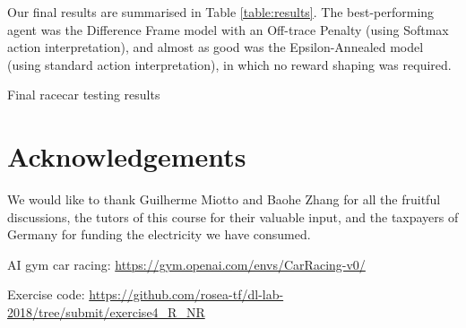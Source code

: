 \documentclass[a4paper, 11pt, conference]{ieeeconf}      %
\begin{document}
Our final results are summarised in Table \ref{table:results}. The best-performing agent was the Difference Frame model with an Off-trace Penalty (using Softmax action interpretation), and almost as good was the Epsilon-Annealed model (using standard action interpretation), in which no reward shaping was required.

\begin{table}
  \centering
  \caption{Final racecar testing results}
  \label{table:results}
  
  \end{table}

\section*{Acknowledgements}

We would like to thank Guilherme Miotto and Baohe Zhang for all the fruitful discussions, the tutors of this course for their valuable input, and the taxpayers of Germany for funding the electricity we have consumed.




\begin{thebibliography}{99}

 AI gym car racing: \url{https://gym.openai.com/envs/CarRacing-v0/}

 Exercise code: \url{https://github.com/rosea-tf/dl-lab-2018/tree/submit/exercise4_R_NR}



\end{thebibliography}









\end{document}
